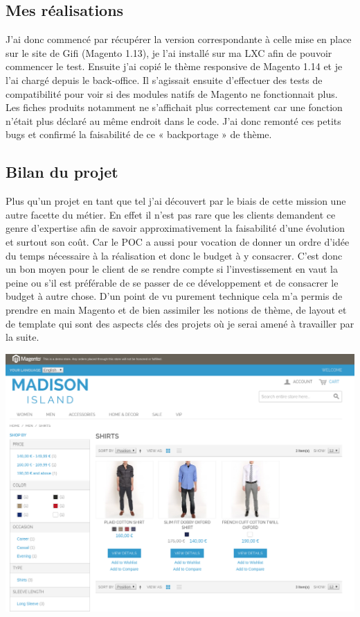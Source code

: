 \documentclass[a4paper,11pt,twoside]{report}
\begin{document}
    \subsection*{Mes réalisations}
    J'ai donc commencé par récupérer la version correspondante à celle mise en place sur le site de Gifi (Magento 1.13), je l'ai installé sur ma LXC afin de pouvoir commencer le test. Ensuite j'ai copié le thème responsive de Magento 1.14 et je l'ai chargé depuis le back-office. Il s'agissait ensuite d'effectuer des tests de compatibilité pour voir si des modules natifs de Magento ne fonctionnait plus. Les fiches produits notamment ne s'affichait plus correctement car une fonction n'était plus déclaré au même endroit dans le code. J'ai donc remonté ces petits bugs et confirmé la faisabilité de ce « backportage » de thème. 
    \subsection*{Bilan du projet}
    Plus qu'un projet en tant que tel j'ai découvert par le biais de cette mission une autre facette du métier. En effet il n'est pas rare que les clients demandent ce genre d'expertise afin de savoir approximativement la faisabilité d'une évolution et surtout son coût. Car le POC a aussi pour vocation de donner un ordre d'idée du temps nécessaire à la réalisation et donc le budget à y consacrer. C'est donc un bon moyen pour le client de se rendre compte si l'investissement en vaut la peine ou s'il est préférable de se passer de ce développement et de consacrer le budget à autre chose. D'un point de vu purement technique cela m'a permis de prendre en main Magento et de bien assimiler les notions de thème, de layout et de template qui sont des aspects clés des projets où je serai amené à travailler par la suite. 
    \begin{center}
      \includegraphics[width=\textwidth]{images/new_responsive_magento_theme.png} 
      \label{responsive_theme_magento}
    \end{center}
\end{document}
